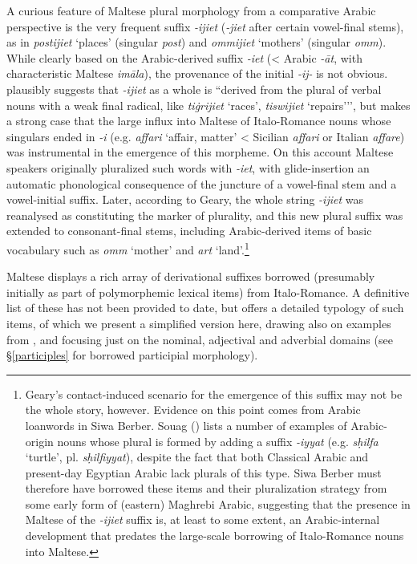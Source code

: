 \documentclass[output=paper]{langsci/langscibook}
\begin{document}
A curious feature of Maltese plural morphology from a comparative Arabic perspective is the very frequent suffix \textit{-ijiet} (\textit{-jiet} after certain vowel-final stems), as in \textit{postijiet} `places' (singular \textit{post}) and \textit{ommijiet} `mothers' (singular \textit{omm}). While clearly based on the Arabic-derived suffix \textit{-iet} (< Arabic \textit{-\={a}t}, with characteristic Maltese \textit{im\={a}la}), the provenance of the initial \textit{-ij-} is not obvious. \cite{mifsud2011} plausibly suggests that \textit{-ijiet} as a whole is ``derived from the plural of verbal nouns with a weak final radical, like \textit{tiġrijiet} `races', \textit{tiswijiet} `repairs’'', but \cite{geary2017} makes a strong case that the large influx into Maltese of Italo-Romance nouns whose singulars ended in \textit{-i} (e.g. \textit{affari} `affair, matter' < Sicilian \textit{affari} or Italian \textit{affare}) was instrumental in the emergence of this morpheme. On this account Maltese speakers originally pluralized such words with \textit{-iet}, with glide-insertion an automatic phonological consequence of the juncture of a vowel-final stem and a vowel-initial suffix. Later, according to Geary, the whole string \textit{-ijiet} was reanalysed as constituting the marker of plurality, and this new plural suffix was extended to consonant-final stems, including Arabic-derived items of basic vocabulary such as \textit{omm} `mother' and \textit{art} `land'.\footnote{Geary's contact-induced scenario for the emergence of this suffix may not be the whole story, however. Evidence on this point comes from Arabic loanwords in Siwa Berber. Souag (\citeyear[74]{Souag2013book}) lists a number of examples of Arabic-origin nouns whose plural is formed by adding a suffix \textit{-iyyat} (e.g. \textit{sḥilfa} `turtle', pl. \textit{sḥilfiyyat}), despite the fact that both Classical Arabic and present-day Egyptian Arabic lack plurals of this type. Siwa Berber must therefore have borrowed these items and their pluralization strategy from some early form of (eastern) Maghrebi Arabic, suggesting that the presence in Maltese of the \textit{-ijiet} suffix is, at least to some extent, an Arabic-internal development that predates the large-scale borrowing of Italo-Romance nouns into Maltese.} %

Maltese displays a rich array of derivational suffixes borrowed (presumably initially as part of polymorphemic lexical items) from Italo-Romance. A definitive list of these has not been provided to date, but \cite{Saade2019} offers a detailed typology of such items, of which we present a simplified version here, drawing also on examples from \cite{brincatmifsud2015}, and focusing just on the nominal, adjectival and adverbial domains (see §\ref{participles} for borrowed participial morphology). 
\end{document}
